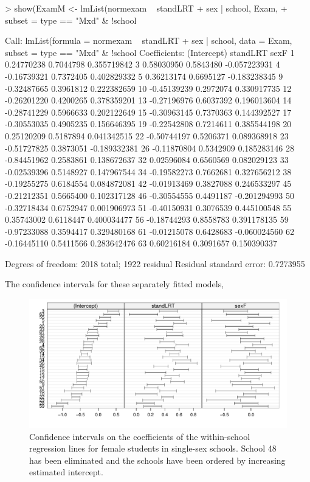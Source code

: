 \documentclass[12pt]{article}
\begin{document}
\begin{Schunk}
\begin{Sinput}
> show(ExamM <- lmList(normexam ~ standLRT + sex | school, Exam, 
+     subset = type == "Mxd" & !school %
\end{Sinput}
\begin{Soutput}
Call: lmList(formula = normexam ~ standLRT + sex | school, data = Exam,      subset = type == "Mxd" & !school %
Coefficients:
   (Intercept)  standLRT         sexF
1   0.24770238 0.7044798  0.355719842
3   0.58030950 0.5843480 -0.057223931
4  -0.16739321 0.7372405  0.402829332
5   0.36213174 0.6695127 -0.183238345
9  -0.32487665 0.3961812  0.222382659
10 -0.45139239 0.2972074  0.330917735
12 -0.26201220 0.4200265  0.378359201
13 -0.27196976 0.6037392  0.196013604
14 -0.28741229 0.5966633  0.202122649
15 -0.30963145 0.7370363  0.144392527
17 -0.30553035 0.4905235  0.156646395
19 -0.22542808 0.7214611  0.385544198
20  0.25120209 0.5187894  0.041342515
22 -0.50744197 0.5206371  0.089368918
23 -0.51727825 0.3873051 -0.189332381
26 -0.11870804 0.5342909  0.185283146
28 -0.84451962 0.2583861  0.138672637
32  0.02596084 0.6560569  0.082029123
33 -0.02539396 0.5148927  0.147967544
34 -0.19582273 0.7662681  0.327656212
38 -0.19255275 0.6184554  0.084872081
42 -0.01913469 0.3827088  0.246533297
45 -0.21212351 0.5665400  0.102317128
46 -0.30554555 0.4491187 -0.201294993
50 -0.32718434 0.6752947  0.001906973
51 -0.40150931 0.3076539  0.445100548
55  0.35743002 0.6118447  0.400034477
56 -0.18744293 0.8558783  0.391178135
59 -0.97233088 0.3594417  0.329480168
61 -0.01215078 0.6428683 -0.060024560
62 -0.16445110 0.5411566  0.283642476
63  0.60216184 0.3091657  0.150390337

Degrees of freedom: 2018 total; 1922 residual
Residual standard error: 0.7273955
\end{Soutput}
\end{Schunk}
The confidence intervals for these separately fitted models, 
\begin{figure}[tbp]
  \centering
  \includegraphics[width=\textwidth]{figs/SoftRev-Examplot6b}
  \caption{Confidence intervals on the coefficients of the
    within-school regression lines for female students in single-sex
    schools. School 48 has been eliminated and the schools have been
    ordered by increasing estimated intercept.}
  \label{fig:Examplot6b}
\end{figure}
\end{document}
